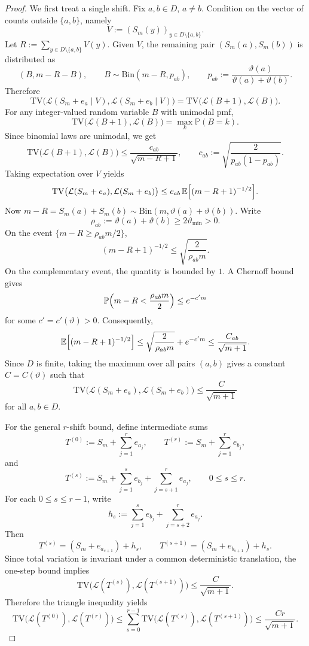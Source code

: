\documentclass{article}
\newcommand{\TV}{\mathrm{TV}}
\newcommand{\Bin}{\mathrm{Bin}}
\newcommand{\E}{\mathbb E}
\newcommand{\Pbb}{\mathbb P}
\newcommand{\1}{\mathbf 1}
\begin{document}
\begin{proof}
We first treat a single shift. Fix $a,b\in D$, $a\neq b$. Condition on the vector of counts outside $\{a,b\}$,
namely
\[
V:=(S_m(y))_{y\in D\setminus\{a,b\}}.
\]
Let $R:=\sum_{y\in D\setminus\{a,b\}}V(y)$. Given $V$, the remaining pair $(S_m(a),S_m(b))$ is distributed as
\[
(B,m-R-B),\qquad B\sim \Bin(m-R,p_{ab}),
\qquad p_{ab}:=\frac{\vartheta(a)}{\vartheta(a)+\vartheta(b)}.
\]
Therefore
\[
\TV\bigl(\mathcal L(S_m+e_a\mid V),\mathcal L(S_m+e_b\mid V)\bigr)
=
\TV\bigl(\mathcal L(B+1),\mathcal L(B)\bigr).
\]
For any integer-valued random variable $B$ with unimodal pmf,
\[
\TV\bigl(\mathcal L(B+1),\mathcal L(B)\bigr)=\max_k \Pbb(B=k).
\]
Since binomial laws are unimodal, we get
\[
\TV\bigl(\mathcal L(B+1),\mathcal L(B)\bigr)
\le \frac{c_{ab}}{\sqrt{m-R+1}},
\qquad
c_{ab}:=\sqrt{\frac{2}{p_{ab}(1-p_{ab})}}.
\]
Taking expectation over $V$ yields
\[
\TV\bigl(\mathcal L(S_m+e_a),\mathcal L(S_m+e_b)\bigr)
\le c_{ab}\,\E\Bigl[(m-R+1)^{-1/2}\Bigr].
\]
Now $m-R=S_m(a)+S_m(b)\sim \Bin(m,\vartheta(a)+\vartheta(b))$. Write
\[
\rho_{ab}:=\vartheta(a)+\vartheta(b)\ge 2\vartheta_{\min}>0.
\]
On the event $\{m-R\ge \rho_{ab}m/2\}$,
\[
(m-R+1)^{-1/2}\le \sqrt{\frac{2}{\rho_{ab}m}}.
\]
On the complementary event, the quantity is bounded by $1$. A Chernoff bound gives
\[
\Pbb\Bigl(m-R<\frac{\rho_{ab}m}{2}\Bigr)\le e^{-c'm}
\]
for some $c'=c'(\vartheta)>0$. Consequently,
\[
\E\Bigl[(m-R+1)^{-1/2}\Bigr]
\le \sqrt{\frac{2}{\rho_{ab}m}}+e^{-c'm}
\le \frac{C_{ab}}{\sqrt{m+1}}.
\]
Since $D$ is finite, taking the maximum over all pairs $(a,b)$ gives a constant $C=C(\vartheta)$ such that
\[
\TV\bigl(\mathcal L(S_m+e_a),\mathcal L(S_m+e_b)\bigr)
\le \frac{C}{\sqrt{m+1}}
\]
for all $a,b\in D$.

For the general $r$-shift bound, define intermediate sums
\[
T^{(0)}:=S_m+\sum_{j=1}^r e_{a_j},
\qquad
T^{(r)}:=S_m+\sum_{j=1}^r e_{b_j},
\]
and
\[
T^{(s)}:=S_m+\sum_{j=1}^{s}e_{b_j}+\sum_{j=s+1}^{r}e_{a_j},
\qquad 0\le s\le r.
\]
For each $0\le s\le r-1$, write
\[
h_s:=\sum_{j=1}^{s}e_{b_j}+\sum_{j=s+2}^{r}e_{a_j}.
\]
Then
\[
T^{(s)}=(S_m+e_{a_{s+1}})+h_s,
\qquad
T^{(s+1)}=(S_m+e_{b_{s+1}})+h_s.
\]
Since total variation is invariant under a common deterministic translation, the one-step bound implies
\[
\TV\bigl(\mathcal L(T^{(s)}),\mathcal L(T^{(s+1)})\bigr)
\le \frac{C}{\sqrt{m+1}}.
\]
Therefore the triangle inequality yields
\[
\TV\bigl(\mathcal L(T^{(0)}),\mathcal L(T^{(r)})\bigr)
\le \sum_{s=0}^{r-1}\TV\bigl(\mathcal L(T^{(s)}),\mathcal L(T^{(s+1)})\bigr)
\le \frac{Cr}{\sqrt{m+1}}.
\]
\end{proof}
\end{document}
